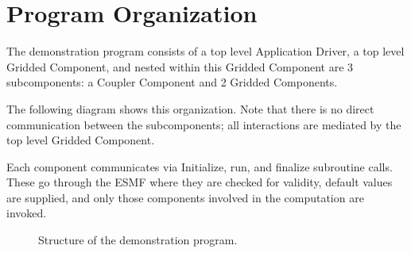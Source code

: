 
\section{Program Organization}

The demonstration program consists of a top level Application
Driver, a top level Gridded Component, and nested within this Gridded
Component are 3 subcomponents: a Coupler Component and 2 Gridded Components.

The following diagram shows this organization.  Note that there
is no direct communication between the subcomponents; all
interactions are mediated by the top level Gridded Component.

Each component communicates via Initialize, run, and finalize
subroutine calls.  These go through the ESMF where
they are checked for validity, default values are supplied,
and only those components involved in the computation are
invoked.


\begin{figure}[bpht]
\caption[Components]{Structure of the demonstration program.}
\label{fig:democomps}
\begin{center}
\end{center}
\end{figure}


